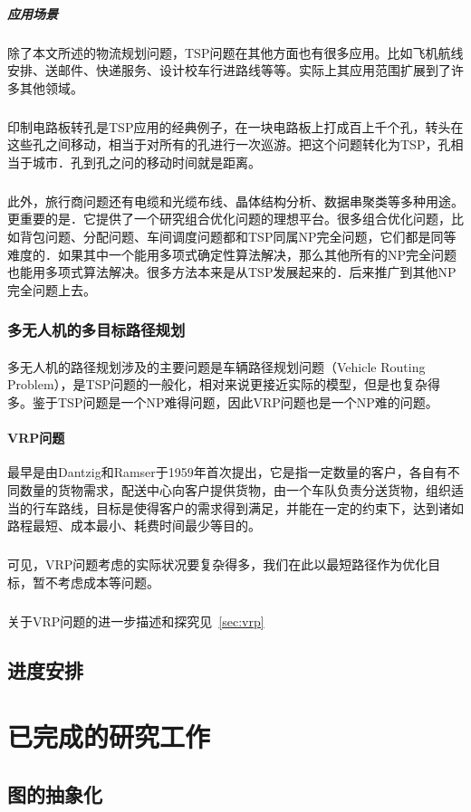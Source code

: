\documentclass[UTF8,a4paper]{ctexart}
\begin{document}
\subparagraph{应用场景}除了本文所述的物流规划问题，TSP问题在其他方面也有很多应用。比如飞机航线安排、送邮件、快递服务、设计校车行进路线等等。实际上其应用范围扩展到了许多其他领域。
\subparagraph{}印制电路板转孔是TSP应用的经典例子，在一块电路板上打成百上千个孔，转头在这些孔之间移动，相当于对所有的孔进行一次巡游。把这个问题转化为TSP，孔相当于城市．孔到孔之问的移动时间就是距离。
\subparagraph{}此外，旅行商问题还有电缆和光缆布线、晶体结构分析、数据串聚类等多种用途。更重要的是．它提供了一个研究组合优化问题的理想平台。很多组合优化问题，比如背包问题、分配问题、车间调度问题都和TSP同属NP完全问题，它们都是同等难度的．如果其中一个能用多项式确定性算法解决，那么其他所有的NP完全问题也能用多项式算法解决。很多方法本来是从TSP发展起来的．后来推广到其他NP完全问题上去。~\cite{tsp2006}

\subsubsection{多无人机的多目标路径规划}
\paragraph{}多无人机的路径规划涉及的主要问题是车辆路径规划问题（Vehicle Routing Problem），是TSP问题的一般化，相对来说更接近实际的模型，但是也复杂得多。鉴于TSP问题是一个NP难得问题，因此VRP问题也是一个NP难的问题。

\paragraph{VRP问题}最早是由Dantzig和Ramser于1959年首次提出，它是指一定数量的客户，各自有不同数量的货物需求，配送中心向客户提供货物，由一个车队负责分送货物，组织适当的行车路线，目标是使得客户的需求得到满足，并能在一定的约束下，达到诸如路程最短、成本最小、耗费时间最少等目的。
\subparagraph{}可见，VRP问题考虑的实际状况要复杂得多，我们在此以最短路径作为优化目标，暂不考虑成本等问题。
\subparagraph{}关于VRP问题的进一步描述和探究见~\ref{sec:vrp}


\subsection{进度安排}

\section{已完成的研究工作}

\subsection{图的抽象化}
\end{document}
